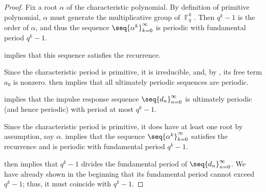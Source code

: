 \begin{proof}
   Fix a root \( \alpha \) of the characteristic polynomial. By definition of primitive polynomial, \( \alpha \) must generate the multiplicative group of \( \BbbF_q^k \). Then \( q^k - 1 \) is the order of \( \alpha \), and thus the sequence \( \seq{ \alpha^k }_{k=0}^\infty \) is periodic with fundamental period \( q^k - 1 \).

   implies that this sequence satisfies the recurrence.

  Since the characteristic period is primitive, it is irreducible, and, by , its free term \( a_0 \) is nonzero.  then implies that all ultimately periodic sequences are periodic.

    implies that the impulse response sequence \( \seq{ d_n }_{n=0}^\infty \) is ultimately periodic (and hence periodic) with period at most \( q^k - 1 \).

  Since the characteristic period is primitive, it does have at least one root by assumption, say \( \alpha \).  implies that the sequence \( \seq{ \alpha^k }_{k=0}^\infty \) satisfies the recurrence and is periodic with fundamental period \( q^k - 1 \).

   then implies that \( q^k - 1 \) divides the fundamental period of \( \seq{ d_n }_{n=0}^\infty \). We have already shown in the beginning that its fundamental period cannot exceed \( q^k - 1 \); thus, it must coincide with \( q^k - 1 \).
\end{proof}

